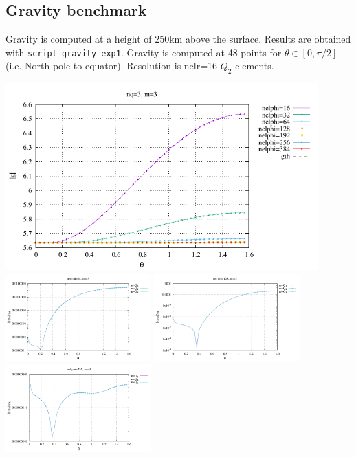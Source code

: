 \newpage
\subsection*{Gravity benchmark}

Gravity is computed at a height of 250km above the surface. 
Results are obtained with {\tt script\_gravity\_exp1}.
Gravity is computed at 48 points for $\theta\in[0,\pi/2]$ (i.e. North pole to equator).
Resolution is nelr=16 $Q_2$ elements.

\begin{center}
\includegraphics[width=12cm]{python_codes/fieldstone_152/RESULTS/exp1/gravity/nelr32/gravity.pdf}\\
\includegraphics[width=5.6cm]{python_codes/fieldstone_152/RESULTS/exp1/gravity/nelr32/gravity_64m.pdf}
\includegraphics[width=5.6cm]{python_codes/fieldstone_152/RESULTS/exp1/gravity/nelr32/gravity_128m.pdf}
\includegraphics[width=5.6cm]{python_codes/fieldstone_152/RESULTS/exp1/gravity/nelr32/gravity_256m.pdf}\\

\end{center}
